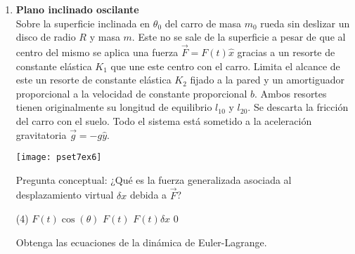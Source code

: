 \documentclass[11pt, spanish, a4paper, twoside]{article}
\begin{document}
\begin{enumerate}
\item
\begin{minipage}[t][6cm]{0.5\textwidth}
\textbf{Plano inclinado oscilante}\\
Sobre la superficie inclinada en $\theta_0$ del carro de masa $m_0$ rueda sin deslizar un disco de radio $R$ y masa $m$.
Este no se sale de la superficie a pesar de que al centro del mismo se aplica una fuerza $\vec{F}= F(t) \hat{x}$ gracias a un resorte de constante elástica $K_1$ que une este centro con el carro.
Limita el alcance de este un resorte de constante elástica $K_2$ fijado a la pared y un amortiguador proporcional a la velocidad de constante proporcional $b$.
Ambos resortes tienen originalmente su longitud de equilibrio $l_{10}$ y $l_{20}$.
Se descarta la fricción del carro con el suelo.
Todo el sistema está sometido a la aceleración gravitatoria $\vec{g}= - g \hat{y}$.\\
\end{minipage}
\begin{minipage}[c][0cm][t]{0.45\textwidth}
	\texttt{[image: pset7ex6]}
\end{minipage}
Pregunta conceptual: ¿Qué es la fuerza generalizada asociada al desplazamiento virtual $\delta x$ debida a $\vec{F}$?\\
\begin{tasks}(4)
	\task $F(t) \cos(\theta)$
	\task $F(t)$
	\task $F(t) \delta x$
	\task $0$
\end{tasks}
Obtenga las ecuaciones de la dinámica de Euler-Lagrange. 



\end{enumerate}
\end{document}
